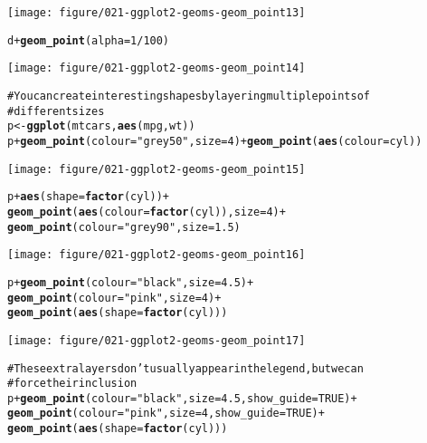 \documentclass[a4paper,titlepage]{tufte-handout}\usepackage{graphicx, color}
\makeatletter
\def\maxwidth{ %
  \ifdim\Gin@nat@width>\linewidth
    \linewidth
  \else
    \Gin@nat@width
  \fi
}
\newcommand{\hlfunctioncall}[1]{\textcolor[rgb]{0.501960784313725,0,0.329411764705882}{\textbf{#1}}}%
\newcommand{\hlstring}[1]{\textcolor[rgb]{0.6,0.6,1}{#1}}%
\newcommand{\hlcomment}[1]{\textcolor[rgb]{0.180392156862745,0.6,0.341176470588235}{#1}}%
\newenvironment{kframe}{%
 \def\at@end@of@kframe{}%
 \ifinner\ifhmode%
  \def\at@end@of@kframe{\end{minipage}}%
  \begin{minipage}{\columnwidth}%
 \fi\fi%
 \def\FrameCommand##1{\hskip\@totalleftmargin \hskip-\fboxsep
 \colorbox{shadecolor}{##1}\hskip-\fboxsep
     \hskip-\linewidth \hskip-\@totalleftmargin \hskip\columnwidth}%
 \MakeFramed {\advance\hsize-\width
   \@totalleftmargin\z@ \linewidth\hsize
   \@setminipage}}%
 {\par\unskip\endMakeFramed%
 \at@end@of@kframe}
\newenvironment{knitrout}{}{} %
\makeatother
\begin{document}
\begin{knitrout}
\begin{kframe}
\end{kframe}\texttt{[image: figure/021-ggplot2-geoms-geom\_point13]} \begin{kframe}\begin{alltt}
d + \hlfunctioncall{geom_point}(alpha = 1/100)
\end{alltt}
\end{kframe}\texttt{[image: figure/021-ggplot2-geoms-geom\_point14]} \begin{kframe}\begin{alltt}
\hlcomment{# You can create interesting shapes by layering multiple points of}
\hlcomment{# different sizes}
p <- \hlfunctioncall{ggplot}(mtcars, \hlfunctioncall{aes}(mpg, wt))
p + \hlfunctioncall{geom_point}(colour=\hlstring{"grey50"}, size = 4) + \hlfunctioncall{geom_point}(\hlfunctioncall{aes}(colour = cyl))
\end{alltt}
\end{kframe}\texttt{[image: figure/021-ggplot2-geoms-geom\_point15]} \begin{kframe}\begin{alltt}
p + \hlfunctioncall{aes}(shape = \hlfunctioncall{factor}(cyl)) +
  \hlfunctioncall{geom_point}(\hlfunctioncall{aes}(colour = \hlfunctioncall{factor}(cyl)), size = 4) +
  \hlfunctioncall{geom_point}(colour=\hlstring{"grey90"}, size = 1.5)
\end{alltt}
\end{kframe}\texttt{[image: figure/021-ggplot2-geoms-geom\_point16]} \begin{kframe}\begin{alltt}
p + \hlfunctioncall{geom_point}(colour=\hlstring{"black"}, size = 4.5) +
  \hlfunctioncall{geom_point}(colour=\hlstring{"pink"}, size = 4) +
  \hlfunctioncall{geom_point}(\hlfunctioncall{aes}(shape = \hlfunctioncall{factor}(cyl)))
\end{alltt}
\end{kframe}\texttt{[image: figure/021-ggplot2-geoms-geom\_point17]} \begin{kframe}\begin{alltt}
\hlcomment{# These extra layers don't usually appear in the legend, but we can}
\hlcomment{# force their inclusion}
p + \hlfunctioncall{geom_point}(colour=\hlstring{"black"}, size = 4.5, show_guide = TRUE) +
  \hlfunctioncall{geom_point}(colour=\hlstring{"pink"}, size = 4, show_guide = TRUE) +
  \hlfunctioncall{geom_point}(\hlfunctioncall{aes}(shape = \hlfunctioncall{factor}(cyl)))
\end{alltt}

\end{kframe}
\end{knitrout}
\end{document}
